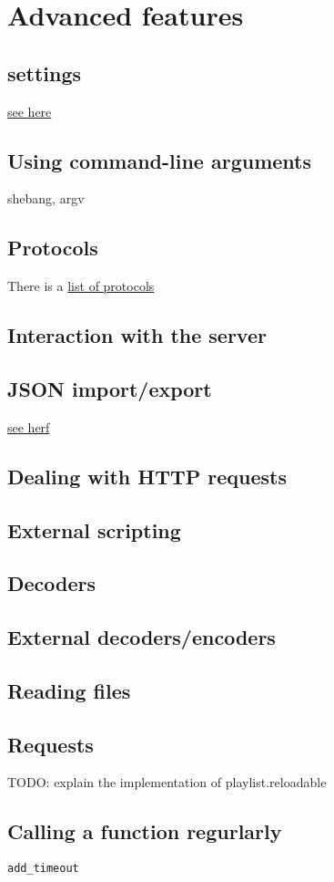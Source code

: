 \chapter{Advanced features}
\section{\Liquidsoap settings}
\href{https://www.liquidsoap.info/doc-dev/settings.html}{see here}

\section{Using command-line arguments}
shebang, argv

\section{Protocols}
There is a \href{https://www.liquidsoap.info/doc-dev/protocols.html}{list of protocols}

\section{Interaction with the server}

\section{JSON import/export}
\href{https://www.liquidsoap.info/doc-dev/json.html}{see herf}

\section{Dealing with HTTP requests}

\section{External scripting}

\section{Decoders}

\section{External decoders/encoders}

\section{Reading files}

\section{Requests}
TODO: explain the implementation of playlist.reloadable

\section{Calling a function regurlarly}
\verb|add_timeout|